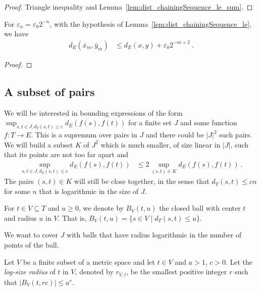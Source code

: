 \begin{proof}
Triangle inequality and Lemma~\ref{lem:dist_chainingSequence_le_sum}.
\end{proof}


\begin{corollary}\label{cor:dist_chainingSequence_pow_two_le}
  \leanok
For $\varepsilon_n = \varepsilon_0 2^{-n}$, with the hypothesis of Lemma~\ref{lem:dist_chainingSequence_le}, we have
\begin{align*}
  d_E(\bar{x}_m, \bar{y}_m)
  &\le d_E(x, y) + \varepsilon_0 2^{-m+2}
  \: .
\end{align*}
\end{corollary}

\begin{proof}

\end{proof}


\subsection{A subset of pairs}

We will be interested in bounding expressions of the form $\sup_{s,t\in J, d_T(s,t) \le c} d_E(f(s), f(t))$ for a finite set $J$ and some function $f : T \to E$.
This is a supremum over pairs in $J$ and there could be $\vert J \vert^2$ such pairs.
We will build a subset $K$ of $J^2$ which is much smaller, of size linear in $\vert J \vert$, such that its points are not too far apart and
\begin{align*}
  \sup_{s,t\in J, d_T(s,t) \le c} d_E(f(s), f(t))
  & \le 2 \sup_{(s,t) \in K} d_E(f(s), f(t))
  \: .
\end{align*}
The pairs $(s, t) \in K$ will still be close together, in the sense that $d_T(s, t) \le c n$ for some $n$ that is logarithmic in the size of $J$.

For $t \in V \subseteq T$ and $u\ge 0$, we denote by $B_V(t, u)$ the closed ball with center $t$ and radius $u$ in $V$.
That is, $B_V(t, u) = \{s \in V \mid d_T(s, t) \le u\}$.

We want to cover $J$ with balls that have radius logarithmic in the number of points of the ball.

\begin{definition}\label{def:logSizeRadius}
  \leanok
Let $V$ be a finite subset of a metric space and let $t \in V$ and $a > 1$, $c > 0$.
Let the \emph{log-size radius} of $t$ in $V$, denoted by $r_{V,t}$, be the smallest positive integer $r$ such that $\vert B_V(t, r c) \vert \le a^{r}$.
\end{definition}


